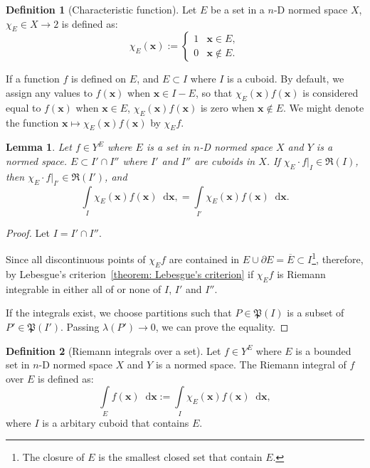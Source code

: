 \documentclass[openany]{book}
\theoremstyle{plain}
\newtheorem{lemma}{Lemma} %
\theoremstyle{definition}
\newtheorem{definition}{Definition}[section] %
\newcommand{\dif}{\mathop{}\!\mathrm{d}} %
\newcommand*{\bv}{\boldsymbol} %
\begin{document}
\begin{definition}[Characteristic function]
	Let $E$ be a set in a $n$-D normed space $X$, $\chi_E \in X \to 2$ is defined as:
	\begin{equation*}
		\chi_E(\bv x) := \begin{cases}
			1 & \bv x \in E,
			\\
			0 & \bv x \notin E.
		\end{cases}
	\end{equation*}
\end{definition}

If a function $f$ is defined on $E$, and $E \subset I$ where $I$ is a cuboid. 
By default, we assign any values to $f(\bv x)$ when $\bv x \in I - E$, so that $\chi_E(\bv x) f(\bv x)$ is considered equal to $f(\bv x)$ when $\bv x \in E$, $\chi_E(\bv x) f(\bv x)$ is zero when $\bv x \notin E$. 
We might denote the function $\bv x \mapsto \chi_E(\bv x) f(\bv x)$ by $\chi_E f$.

\begin{lemma}
	Let $f \in Y^E$ where $E$ is a set in $n$-D normed space $X$ and $Y$ is a normed space.
	$E \subset I' \cap I''$ where $I'$ and $I''$ are cuboids in $X$. 
	If $\chi_E \cdot f|_I \in \mathfrak R(I)$, then $\chi_E \cdot f|_{I'} \in \mathfrak R(I')$, and
	\begin{equation*}
		\int\limits_{I} \chi_E(\bv x) f(\bv x) \dif \bv x,
			= \int\limits_{I'} \chi_E(\bv x) f(\bv x) \dif \bv x.
	\end{equation*} 
\end{lemma}
\begin{proof}
	Let $I = I' \cap I''$. 

	Since all discontinuous points of $\chi_E f$ are contained in $E \cup \partial E = \overline{E}\subset I$\footnote{The closure of $E$ is the smallest closed set that contain $E$.}, therefore, by Lebesgue's criterion~\ref{theorem: Lebesgue's criterion} if $\chi_E f$ is Riemann integrable in either all of or none of $I$, $I'$ and $I''$.

	If the integrals exist, we choose partitions such that $P \in \mathfrak P(I)$ is a subset of $P' \in \mathfrak P(I')$. Passing $\lambda(P') \to 0$, we can prove the equality.
\end{proof}

\begin{definition}[Riemann integrals over a set]
	Let $f \in Y^E$ where $E$ is a bounded set in $n$-D normed space $X$ and $Y$ is a normed space.
	The Riemann integral of $f$ over $E$ is defined as:
	\begin{equation*}
		\int\limits_E f(\bv x) \dif \bv x := \int\limits_I \chi_E(\bv x) f(\bv x) \dif \bv x,
	\end{equation*}
	where $I$ is a arbitary cuboid that contains $E$.
\end{definition}
\end{document}
